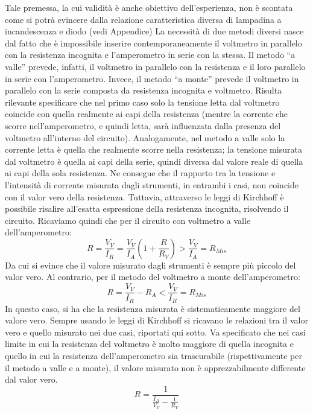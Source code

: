 \documentclass{article}
\begin{document}
Tale premessa, la cui validità è anche obiettivo dell’esperienza, non è scontata
come si potrà evincere dalla relazione caratteristica diversa di lampadina a incandescenza
e diodo (vedi Appendice) La necessità di due metodi diversi nasce
dal fatto che è impossibile inserire contemporaneamente il voltmetro in parallelo
con la resistenza incognita e l’amperometro in serie con la stessa. Il metodo “a valle” prevede, infatti, il voltmetro in parallelo con la resistenza e il loro parallelo
in serie con l’amperometro. Invece, il metodo “a monte” prevede il voltmetro
in parallelo con la serie composta da resistenza incognita e voltmetro. Risulta
rilevante specificare che nel primo caso solo la tensione letta dal voltmetro
coincide con quella realmente ai capi della resistenza (mentre la corrente che
scorre nell’amperometro, e quindi letta, sarà influenzata dalla presenza del voltmetro all'interno del circuito). Analogamente, nel metodo a valle solo la corrente letta è quella che
realmente scorre nella resistenza; la tensione misurata dal voltmetro è quella
ai capi della serie, quindi diversa dal valore reale di quella ai capi della sola
resistenza. Ne consegue che il rapporto tra la tensione e l’intensità di corrente
misurata dagli strumenti, in entrambi i casi, non coincide con il valor vero della
resistenza. Tuttavia, attraverso le leggi di Kirchhoff è possibile risalire all’esatta
espressione della resistenza incognita, risolvendo il circuito. Ricaviamo quindi
che per il circuito con voltmetro a valle dell’amperometro:
\begin{equation}
    R = \frac{V_V}{I_R}= \frac{V_V}{I_A}(1+\frac{R}{R_V})> \frac{V_V}{I_A} = R_{Mis}
\end{equation}
Da cui si evince che il valore misurato dagli strumenti è sempre più piccolo del
valor vero. Al contrario, per il metodo del voltmetro a monte dell’amperometro:
\begin{equation}
    R = \frac{V_V}{I_R}-R_A <\frac{V_V}{I_R} = R_{Mis}
\end{equation}
In questo caso, si ha che la resistenza misurata è sistematicamente maggiore del
valore vero. Sempre usando le leggi di Kirchhoff si ricavano le relazioni tra il valor
vero e quello misurato nei due casi, riportati qui sotto. Va specificato che nei
casi limite in cui la resistenza del voltmetro è molto maggiore di quella incognita
e quello in cui la resistenza dell’amperometro sia trascurabile (rispettivamente
per il metodo a valle e a monte), il valore misurato non è apprezzabilmente
differente dal valor vero.
\begin{equation}
    R = \frac{1}{\frac{I_A}{V_V}-\frac{1}{R_V}}
\end{equation}
\end{document}
